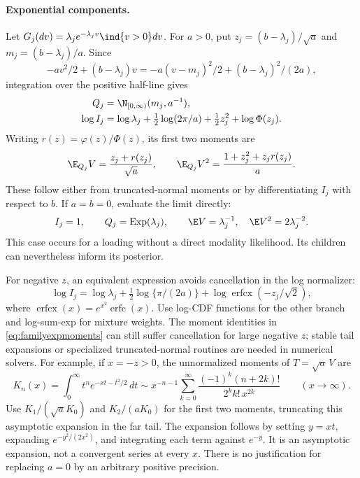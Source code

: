 \paragraph{Exponential components.}
Let \(G_j(dv)=\lambda_j e^{-\lambda_jv}\ind\{v>0\}dv\).
For \(a>0\), put
\(z_j=(b-\lambda_j)/\sqrt a\) and \(m_j=(b-\lambda_j)/a\).
Since
\[
-av^2/2+(b-\lambda_j)v
=-a(v-m_j)^2/2+(b-\lambda_j)^2/(2a),
\]
integration over the positive half-line gives
\begin{align}
Q_j&=\N_{[0,\infty)}(m_j,a^{-1}),\label{eq:familyexp}\\
\log I_j&=\log\lambda_j+\tfrac12\log(2\pi/a)
                 +\tfrac12z_j^2+\log\Phi(z_j).\label{eq:familyexpI}
\end{align}
Writing \(r(z)=\varphi(z)/\Phi(z)\), its first two moments are
\begin{equation}\label{eq:familyexpmoments}
\E_{Q_j}V=\frac{z_j+r(z_j)}{\sqrt a},\qquad
\E_{Q_j}V^2=\frac{1+z_j^2+z_jr(z_j)}{a}.
\end{equation}
These follow either from truncated-normal moments or by differentiating
\(I_j\) with respect to \(b\). If \(a=b=0\), evaluate the limit directly:
\[
I_j=1,\qquad Q_j=\operatorname{Exp}(\lambda_j),\qquad
\E V=\lambda_j^{-1},\quad \E V^2=2\lambda_j^{-2}.
\]
This case occurs for a loading without a direct modality likelihood.
Its children can nevertheless inform its posterior.

For negative \(z\), an equivalent expression avoids cancellation in the
log normalizer:
\begin{equation}\label{eq:experfcx}
\log I_j=\log\lambda_j+\tfrac12\log\{\pi/(2a)\}
             +\log\operatorname{erfcx}(-z_j/\sqrt2),
\end{equation}
where \(\operatorname{erfcx}(x)=e^{x^2}\operatorname{erfc}(x)\).
Use log-CDF functions for the other branch and log-sum-exp for mixture
weights. The moment identities in \eqref{eq:familyexpmoments} can still
suffer cancellation for large negative \(z\); stable tail expansions or
specialized truncated-normal routines are needed in numerical solvers.
For example, if \(x=-z>0\), the unnormalized moments of
\(T=\sqrt a\,V\) are
\[
K_n(x)=\int_0^\infty t^n e^{-xt-t^2/2}\,dt
\sim x^{-n-1}\sum_{k=0}^\infty
\frac{(-1)^k(n+2k)!}{2^k k!\,x^{2k}}\qquad(x\to\infty).
\]
Use \(K_1/(\sqrt a K_0)\) and \(K_2/(aK_0)\) for the first two
moments, truncating this asymptotic expansion in the far tail.
The expansion follows by setting \(y=xt\), expanding
\(e^{-y^2/(2x^2)}\), and integrating each term against \(e^{-y}\).
It is an asymptotic expansion, not a convergent series at every \(x\).
There is no justification for replacing \(a=0\) by an arbitrary
positive precision.


